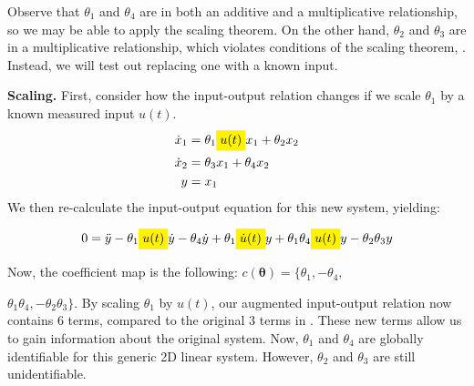 \documentclass[a4paper,fleqn]{cas-dc}
\newcommand{\mathcolorbox}[2]{\colorbox{#1}{$\displaystyle #2$}}
\theoremstyle{definition}
\begin{document}
Observe that $\theta_1$ and $\theta_4$ are in both an additive and a multiplicative relationship, so we may be able to apply the scaling theorem.
On the other hand, $\theta_2$ and $\theta_3$ are in a multiplicative relationship, which violates conditions of the scaling theorem, . Instead, we will test out replacing one with a known input.

\vspace{0.2cm}

\noindent \textbf{Scaling.} First, consider how the input-output relation changes if we scale $\theta_1$ by a known measured input $u(t)$.
\begin{align} \label{eq:2db_generic}
    \dot{x}_1 &= \theta_1 \mathcolorbox{Yellow}{u(t)} x_1 + \theta_2 x_2 \\ \nonumber
    \dot{x}_2 &= \theta_3 x_1 + \theta_4 x_2 \\ \nonumber
    y &= x_1
\end{align}
We then re-calculate the input-output equation for this new system, yielding:
\begin{fleqn}
\begin{align}\label{eq:io_2d_augA_generic}
        0 = \ddot{y} - \theta_1 \mathcolorbox{Yellow}{u(t)} \dot{y} - \theta_4 \dot{y} + \theta_1 \mathcolorbox{Yellow}{\dot{u}(t)} y + \theta_1 \theta_4 \mathcolorbox{Yellow}{u(t)} y - \theta_2 \theta_3 y
\end{align} 
\end{fleqn}
Now, the coefficient map is the following: $c(\pmb{\theta}) = \{\theta_1,  - \theta_4, $

\noindent $\theta_1 \theta_4, - \theta_2 \theta_3\}$.
By scaling $\theta_1$ by $u(t)$, our augmented input-output relation now contains 6 terms, compared to the original 3 terms in . 
These new terms allow us to gain information about the original system.
Now, $\theta_1$ and $\theta_4$ are globally identifiable for this generic 2D linear system.
However, $\theta_2$ and $\theta_3$ are still unidentifiable.

\vspace{0.2cm}
\end{document}
